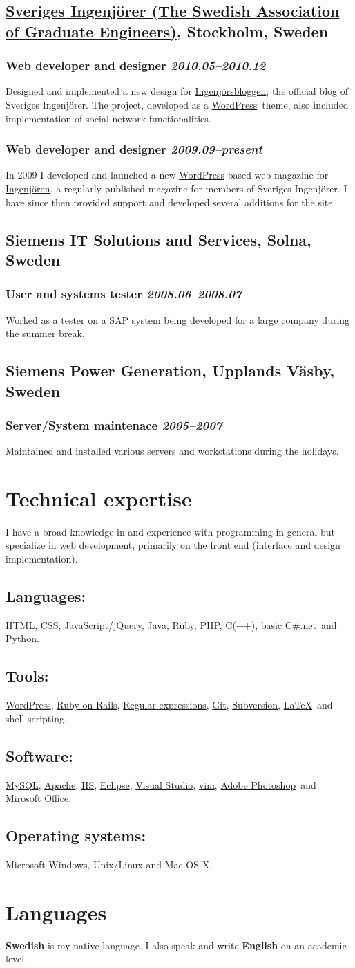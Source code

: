\documentclass[a4paper,11pt]{article}
\newcommand{\icon}[1]{\textcolor{lightgray}{#1}}
\newcommand{\iconl}[1]{\hspace{-0.5cm}\makebox[0.3cm][c]{\icon{#1}}\hspace{0.2cm}}
\newcommand{\worktitle}[1]{\textbf{#1}}
\newcommand{\duration}[1]{\textsl{#1}}
\newcommand{\theplace}[2][]{\subsection*{\textbf{#2}#1}}
\newcommand{\thework}[2]{\subsubsection*{%
  \iconl{$\blacksquare$}%
  \worktitle{#1}%
  \hfill\duration{#2}}\par%
}
\newcommand{\thebold}[1]{\subsection*{\textbf{#1}}\vspace{-1mm}}
\def\html{\href{http://en.wikipedia.org/wiki/HTML}{HTML}}
\def\javascript{\href{http://en.wikipedia.org/wiki/JavaScript}{JavaScript}}
\def\css{\href{http://en.wikipedia.org/wiki/Cascading_Style_Sheets}{CSS}}
\def\clang{\href{http://en.wikipedia.org/wiki/C_\%28programming_language\%29}{C}}
\def\regex{\href{http://en.wikipedia.org/wiki/Regular_expressions}{Regular expressions}}
\def\git{\href{http://git-scm.com/}{Git}}
\def\svn{\href{http://subversion.apache.org/}{Subversion}}
\def\jquery{\href{http://jquery.com/}{jQuery}}
\def\wordpress{\href{http://wordpress.org}{WordPress}}
\def\ror{\href{http://rubyonrails.org}{Ruby on Rails}}
\def\java{\href{http://www.java.com/}{Java}}
\def\php{\href{http://php.net}{PHP}}
\def\ruby{\href{http://www.ruby-lang.org/}{Ruby}}
\def\csharp{\href{http://en.wikipedia.org/wiki/C_Sharp_\%28programming_language\%29}{C\#.net}}
\def\python{\href{http://www.python.org/}{Python}}
\def\mysql{\href{http://www.mysql.com/}{MySQL}}
\def\apache{\href{http://httpd.apache.org/}{Apache}}
\def\iis{\href{http://www.iis.net/}{IIS}}
\def\eclipse{\href{http://www.eclipse.org/eclipse/}{Eclipse}}
\def\vs{\href{http://www.microsoft.com/visualstudio/}{Visual Studio}}
\def\vim{\href{http://www.vim.org/}{vim}}
\def\photoshop{\href{http://www.adobe.com/products/photoshop.html}{Adobe Photoshop}}
\def\office{\href{http://office.microsoft.com/}{Mirosoft Office}}
\def\latex{\href{http://en.wikipedia.org/wiki/LaTeX}{LaTeX}}
\begin{document}
\theplace[, Stockholm, Sweden]{\href{http://www.sverigesingenjorer.se}{Sveriges Ingenjörer (The Swedish Association of Graduate Engineers)}}

\thework{Web developer and designer}{2010.05--2010.12}
Designed and implemented a new design for \href{http://www.ingenjorsbloggen.se}{Ingenjörsbloggen}, the official blog of Sveriges Ingenjörer. The project, developed as a \wordpress\ theme, also included implementation of social network functionalities.

\thework{Web developer and designer}{2009.09--present}
In 2009 I developed and launched a new \wordpress-based web magazine for \href{http://www.ingenjoren.se}{Ingenjören}, a regularly published magazine for members of Sveriges Ingenjörer. I have since then provided support and developed several additions for the site.

\theplace[, Solna, Sweden]{Siemens IT Solutions and Services}

\thework{User and systems tester}{2008.06--2008.07}
Worked as a tester on a SAP system being developed for a large company during the summer break.

\theplace[, Upplands Väsby, Sweden]{Siemens Power Generation}

\thework{Server/System maintenace}{2005--2007}
Maintained and installed various servers and workstations during the holidays.
\section*{Technical expertise}%
I have a broad knowledge in and experience with programming in general but specialize in web development, primarily on the front end (interface and design implementation).

\thebold{Languages:} \html, \css, \javascript/\jquery, \java, \ruby, \php, \clang(++), basic \csharp\ and \python.

\thebold{Tools:} \wordpress, \ror, \regex, \git, \svn, \latex\ and shell scripting.

\thebold{Software:} \mysql, \apache, \iis, \eclipse, \vs, \vim, \photoshop\ and \office.

\thebold{Operating systems:} Microsoft Windows, Unix/Linux and Mac OS X.
\section*{Languages}%
\textbf{Swedish} is my native language. I also speak and write \textbf{English} on an academic level.
\end{document}
